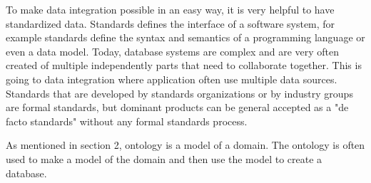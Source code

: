 To make data integration possible in an easy way, it is very helpful to have standardized data. Standards defines the interface of a software system, for example standards define the syntax and semantics of a programming language or even a data model. Today, database systems are complex and are very often created of multiple independently parts that need to collaborate together. This is going to data integration where application often use multiple data sources. Standards that are developed by standards organizations or by industry groups are formal standards, but dominant products can be general accepted as a "de facto standards" without any formal standards process. \cite{database}

As mentioned in section 2, ontology is a model of a domain. The ontology is often used to make a model of the domain and then use the model to create a database. %